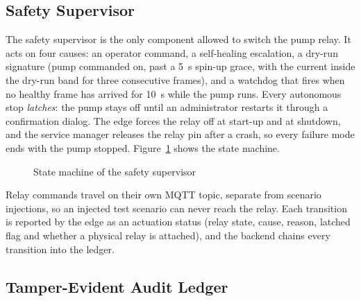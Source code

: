 \subsection{Safety Supervisor}

The safety supervisor is the only component allowed to switch the pump relay. It acts on four causes: an operator command, a self-healing escalation, a dry-run signature (pump commanded on, past a 5~s spin-up grace, with the current inside the dry-run band for three consecutive frames), and a watchdog that fires when no healthy frame has arrived for 10~s while the pump runs. Every autonomous stop \emph{latches}: the pump stays off until an administrator restarts it through a confirmation dialog. The edge forces the relay off at start-up and at shutdown, and the service manager releases the relay pin after a crash, so every failure mode ends with the pump stopped. Figure~\ref{fig:safetysm} shows the state machine.

\begin{figure}[htbp]
\centering
{}
\caption{State machine of the safety supervisor}
\label{fig:safetysm}
\end{figure}

Relay commands travel on their own MQTT topic, separate from scenario injections, so an injected test scenario can never reach the relay. Each transition is reported by the edge as an actuation status (relay state, cause, reason, latched flag and whether a physical relay is attached), and the backend chains every transition into the ledger.

\subsection{Tamper-Evident Audit Ledger}

